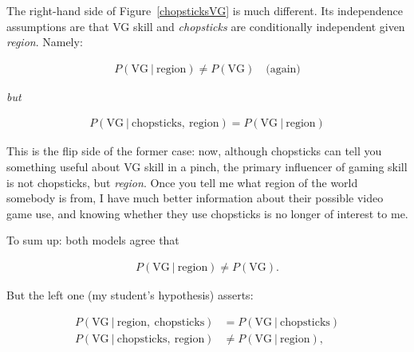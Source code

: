 The right-hand side of Figure~\ref{chopsticksVG} is much different. Its
independence assumptions are that \textsf{VG skill} and
\textit{\textsf{chopsticks}} are conditionally independent given
\textit{\textsf{region}}. Namely:

\vspace{-.1in}
\begin{samepage}
\begin{align*}
P(\textrm{VG}\ |\ \textrm{region}) \neq P(\textrm{VG}) \quad \textrm{(again)}
\end{align*}
\begin{center}
\textit{but}
\end{center}
\vspace{-.1in}
\begin{align*}
P(\textrm{VG}\ |\ \textrm{chopsticks},\ \textrm{region}) =
P(\textrm{VG}\ |\ \textrm{region})
\end{align*}
\end{samepage}
\vspace{-.1in}

This is the flip side of the former case: now, although \textsf{chopsticks} can
tell you something useful about \textsf{VG skill} in a pinch, the primary
influencer of gaming skill is not \textsf{chopsticks}, but
\textit{\textsf{region}}. Once you tell me what region of the world somebody is
from, I have much better information about their possible video game use, and
knowing whether they use chopsticks is no longer of interest to me.

\bigskip

To sum up: both models agree that

\vspace{-.1in}
\begin{align*}
P(\textrm{VG}\ |\ \textrm{region}) \neq P(\textrm{VG}).
\end{align*}
\vspace{-.1in}

But the left one (my student's hypothesis) asserts:

\vspace{-.1in}
\begin{align*}
P(\textrm{VG}\ |\ \textrm{region},\ \textrm{chopsticks}) &=
P(\textrm{VG}\ |\ \textrm{chopsticks})\\
P(\textrm{VG}\ |\ \textrm{chopsticks},\ \textrm{region}) &\neq
P(\textrm{VG}\ |\ \textrm{region}),
\end{align*}
\vspace{-.1in}

